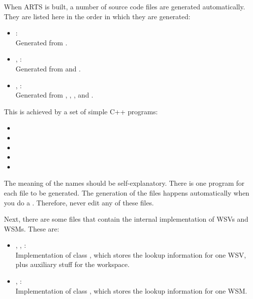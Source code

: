 \vspace{2ex}
When ARTS is built, a number of source code files are generated
automatically. They are listed here in the order in which they are
generated: 
\begin{itemize}
\item {}:\\
  Generated from .
\item {}, :\\
  Generated from  and . 
\item {}, :\\
  Generated from ,
  , , and .
\end{itemize}
This is achieved by a set of simple C++ programs:
\begin{itemize}
\item {}
\item {}
\item {}
\item {}
\item {}
\end{itemize}
The meaning of the names should be self-explanatory. There is one program
for each file to be generated.  The generation of the
 files happens automatically when you do a
. Therefore, never edit any of these files.

Next, there are some files that contain the internal implementation
of WSVs and WSMs. These are:
\begin{itemize}
\item {}, ,
  :\\
  Implementation of class
  , which stores the lookup information for one
  WSV, plus auxiliary stuff for the workspace.
\item {}, :\\
  Implementation of class , which stores the
  lookup information for one WSM.
\end{itemize}

